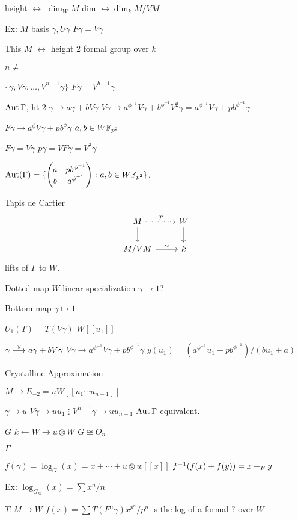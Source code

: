 height $\leftrightarrow$ $\dim_W M$
dim $\leftrightarrow \dim_k M/VM$



Ex: $M$ basis $\gamma, U\gamma$
$F\gamma= V \gamma$

This $M$ $\leftrightarrow$ height 2 formal group over $k$


$n \neq $

$\{\gamma, V \gamma, \ldots, V^{n-1} \gamma\}$
$F\gamma= V^{b-1} \gamma$

$\operatorname{Aut} \Gamma$, ht 2
$\gamma \to a \gamma + b V \gamma$
$V\gamma \to a^{\phi^{-1}} V \gamma + b^{\phi^{-1}} V^2 \gamma = a^{\phi^{-1}} V \gamma + p b^{\phi^{-1}} \gamma$

$F\gamma \to a^{\phi} V \gamma + p b^\phi \gamma$
$a,b \in W\mathbb{F}_{p^2}$

$F\gamma = V\gamma$
$p \gamma = VF\gamma= V^2 \gamma$

$\operatorname{Aut}(\Gamma)= \{ \begin{pmatrix} a & pb^{\phi^{-1}} \\ b & a^{\phi^{-1}} \end{pmatrix} \colon a,b \in W\mathbb{F}_{p^2}\}$. 


Tapis de Cartier
	\[
	\begin{tikzcd}
	M \arrow[dotted]{r}{T} \arrow{d} & W \arrow{d} \\
	M/VM \arrow{r}{\sim} & k
	\end{tikzcd}
	\]
lifts of $\Gamma$ to $W$. 


Dotted map $W$-linear specialization $\gamma \to 1$?

Bottom map $\gamma \mapsto 1$

$U_1(T)= T(V\gamma)$
$W[[u_1]]$

$\gamma \stackrel{y}{\longrightarrow} a \gamma + bV \gamma$
$V \gamma \to a^{\phi^{-1}} V \gamma + p b^{\phi^{-1}} \gamma$
$y(u_1)= (a^{\phi^{-1}} u_1 + pb^{\phi^{-1}})/(bu_1+a)$



Crystalline Approximation

$M \to E_{-2}= uW[[u_1 \cdots u_{n-1}]]$

$\gamma \to u$
$V \gamma \to uu_1$
$\vdots$
$V^{n-1}\gamma \to uu_{n-1}$
$\operatorname{Aut} \Gamma$ equivalent. 

$G$
$k \leftarrow W \rightarrow u \otimes W$ 
$G \cong O_n$

$\Gamma$

$f(\gamma) = \log_G(x)= x+ \cdots + u \otimes w[[x]]$
$f^{-1}(f(x)+f(y))= x +_F y$


Ex: $\log_{G_m}(x)= \sum x^n/n$

$T: M \to W$
$f(x)= \sum T(F^n \gamma) x^{p^n}/p^n$
is the log of a formal $?$ over $W$


